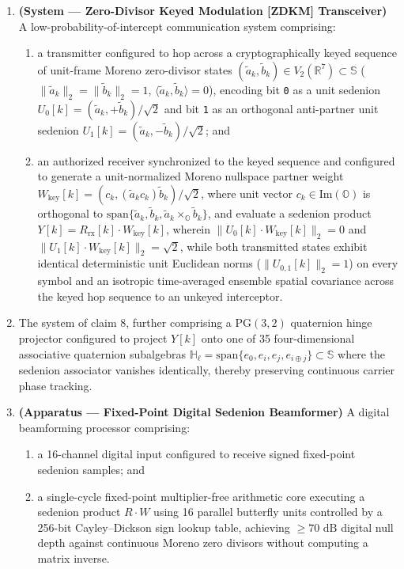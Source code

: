 \documentclass[12pt,letterpaper]{article}
\begin{document}
\begin{enumerate}[leftmargin=20pt,itemsep=4pt]
    \item \textbf{(System --- Zero-Divisor Keyed Modulation [ZDKM] Transceiver)} A low-probability-of-intercept communication system comprising:
    \begin{enumerate}[leftmargin=16pt,itemsep=1pt]
        \item a transmitter configured to hop across a cryptographically keyed sequence of unit-frame Moreno zero-divisor states $(\tilde{a}_k, \tilde{b}_k) \in V_2(\mathbb{R}^7) \subset \mathbb{S}$ ($\|\tilde{a}_k\|_2 = \|\tilde{b}_k\|_2 = 1$, $\langle \tilde{a}_k, \tilde{b}_k\rangle = 0$), encoding bit \texttt{0} as a unit sedenion $U_0[k] = (\tilde{a}_k, +\tilde{b}_k)/\sqrt{2}$ and bit \texttt{1} as an orthogonal anti-partner unit sedenion $U_1[k] = (\tilde{a}_k, -\tilde{b}_k)/\sqrt{2}$; and
        \item an authorized receiver synchronized to the keyed sequence and configured to generate a unit-normalized Moreno nullspace partner weight $W_{\mathrm{key}}[k] = (c_k, (\tilde{a}_k c_k)\tilde{b}_k)/\sqrt{2}$, where unit vector $c_k \in \mathrm{Im}(\mathbb{O})$ is orthogonal to $\mathrm{span}\{\tilde{a}_k, \tilde{b}_k, \tilde{a}_k \times_{\mathbb{O}} \tilde{b}_k\}$, and evaluate a sedenion product $Y[k] = R_{\mathrm{rx}}[k] \cdot W_{\mathrm{key}}[k]$, wherein $\|U_0[k] \cdot W_{\mathrm{key}}[k]\|_2 = 0$ and $\|U_1[k] \cdot W_{\mathrm{key}}[k]\|_2 = \sqrt{2}$, while both transmitted states exhibit identical deterministic unit Euclidean norms ($\|U_{0,1}[k]\|_2 = 1$) on every symbol and an isotropic time-averaged ensemble spatial covariance across the keyed hop sequence to an unkeyed interceptor.
    \end{enumerate}

    \item The system of claim 8, further comprising a $\mathrm{PG}(3,2)$ quaternion hinge projector configured to project $Y[k]$ onto one of 35 four-dimensional associative quaternion subalgebras $\mathbb{H}_{\ell} = \mathrm{span}\{e_0, e_i, e_j, e_{i\oplus j}\} \subset \mathbb{S}$ where the sedenion associator vanishes identically, thereby preserving continuous carrier phase tracking.

    \item \textbf{(Apparatus --- Fixed-Point Digital Sedenion Beamformer)} A digital beamforming processor comprising:
    \begin{enumerate}[leftmargin=16pt,itemsep=1pt]
        \item a 16-channel digital input configured to receive signed fixed-point sedenion samples; and
        \item a single-cycle fixed-point multiplier-free arithmetic core executing a sedenion product $R \cdot W$ using 16 parallel butterfly units controlled by a 256-bit Cayley--Dickson sign lookup table, achieving $\ge 70\text{ dB}$ digital null depth against continuous Moreno zero divisors without computing a matrix inverse.
    \end{enumerate}


\end{enumerate}
\end{document}
